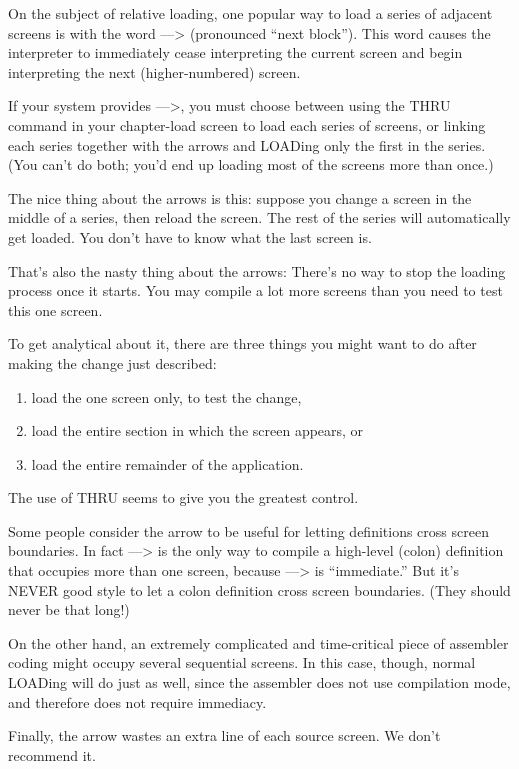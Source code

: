 On the subject of relative loading, one popular way to load a series of adjacent
screens is with the word --\/--> (pronounced ``next block'').  This word
causes the interpreter to immediately cease interpreting the current
screen and begin interpreting the next (higher-numbered) screen.

If your system provides --\/-->, you must choose between using the
THRU command in your chapter-load screen to load each series of
screens, or linking each series together with the arrows and LOADing
only the first in the series.  (You can't do both; you'd end up loading most
of the screens more than once.)

The nice thing about the arrows is this: suppose you change a screen
in the middle of a series, then reload the screen.  The rest of the series will
automatically get loaded.  You don't have to know what the last screen is.

That's also the nasty thing about the arrows: There's no way to stop
the loading process once it starts.  You may compile a lot more screens
than you need to test this one screen.

To get analytical about it, there are three things you might want to
do after making the change just described:
\begin{enumerate}
\item load the one screen only, to test the change,
\item load the entire section in which the screen appears,
or
\item load the entire remainder of the application.
\end{enumerate}
The use of THRU seems to give you the greatest control.

Some people consider the arrow to be useful for letting definitions
cross screen boundaries.  In fact --\/--> is the only way to compile a high-level
(colon) definition that occupies more than one screen, because --\/--> is
``immediate.'' But it's NEVER good style to let a colon definition cross
screen boundaries.  (They should never be that long!)

On the other hand, an extremely complicated and time-critical piece
of assembler coding might occupy several sequential screens.  In this
case, though, normal LOADing will do just as well, since the assembler
does not use compilation mode, and therefore does not require
immediacy.

Finally, the arrow wastes an extra line of each source screen.  We
don't recommend it.
